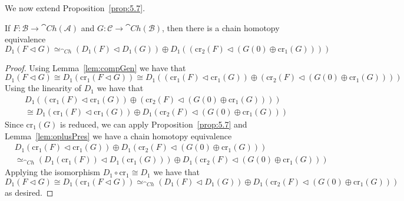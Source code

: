 We now extend Proposition~\ref{prop:5.7}.

\begin{prop}[label=prop:5.10]
    If $F:\mathcal{B}\to \cat{Ch}(\mathcal{A})$ and $G:\mathcal{C}\to \cat{Ch}(\mathcal{B})$, then there is a  chain homotopy equivalence
    \begin{equation*}
        D_1(F\lhd G)\simeq_{\cat{Ch}}(D_1(F)\lhd D_1(G))\oplus D_1((\text{cr}_2(F)\lhd (G(0)\oplus \text{cr}_1(G))))
    \end{equation*}
\end{prop}
\begin{proof}
    Using Lemma~\ref{lem:compGen} we have that 
    \begin{equation*}
        D_1(F\lhd G) \cong D_1(\text{cr}_1(F\lhd G)) \cong D_1((\text{cr}_1(F)\lhd \text{cr}_1(G))\oplus (\text{cr}_2(F)\lhd (G(0)\oplus \text{cr}_1(G))))
    \end{equation*}
    Using the linearity of $D_1$ we have that 
    \begin{align*}
        &D_1((\text{cr}_1(F)\lhd \text{cr}_1(G))\oplus (\text{cr}_2(F)\lhd (G(0)\oplus \text{cr}_1(G)))) \\
        &\cong D_1(\text{cr}_1(F)\lhd \text{cr}_1(G))\oplus D_1(\text{cr}_2(F)\lhd (G(0)\oplus \text{cr}_1(G)))
    \end{align*}
    Since $\text{cr}_1(G)$ is reduced, we can apply Proposition~\ref{prop:5.7} and Lemma~\ref{lem:oplusPres} we have a  chain homotopy equivalence
    \begin{align*}
        &D_1(\text{cr}_1(F)\lhd \text{cr}_1(G))\oplus D_1(\text{cr}_2(F)\lhd (G(0)\oplus \text{cr}_1(G))) \\
        &\simeq_{\cat{Ch}} (D_1(\text{cr}_1(F))\lhd D_1(\text{cr}_1(G)))\oplus D_1(\text{cr}_2(F)\lhd (G(0)\oplus \text{cr}_1(G)))
    \end{align*}
    Applying the isomorphism $D_1\circ \text{cr}_1 \cong D_1$ we have that 
    \begin{equation*}
        D_1(F\lhd G) \cong D_1(\text{cr}_1(F\lhd G)) \simeq_{\cat{Ch}} (D_1(F)\lhd D_1(G))\oplus D_1(\text{cr}_2(F)\lhd (G(0)\oplus \text{cr}_1(G)))
    \end{equation*}
    as desired.
\end{proof}


